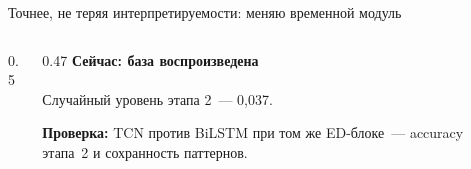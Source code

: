 \documentclass[aspectratio=169,10pt]{beamer}
\begin{document}
\begin{frame}{Точнее, не теряя интерпретируемости: меняю временной модуль}
\begin{columns}[T,onlytextwidth]
\begin{column}{0.5\textwidth}
\vspace{0.3em}
\centering
\end{column}
\begin{column}{0.47\textwidth}
\scriptsize
\textbf{Сейчас: база воспроизведена}\\[0.2em]
{}\\[0.2em]
Случайный уровень этапа 2~--- 0,037.

\vspace{0.35em}
\textbf{Проверка:} TCN против BiLSTM при том же ED-блоке~--- accuracy этапа~2 и сохранность паттернов.
\end{column}
\end{columns}

\end{frame}
\end{document}
